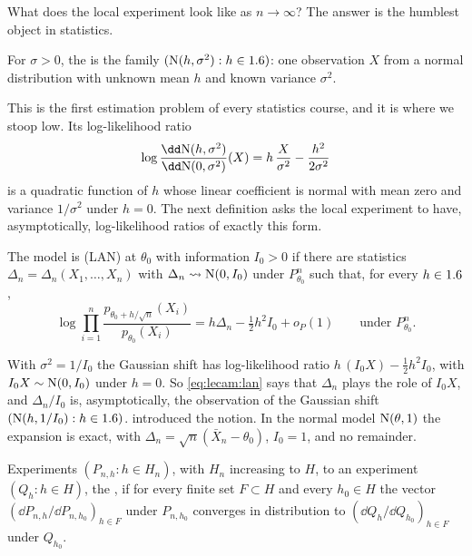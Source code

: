 \begin{refsection}
What does the local experiment look like as $n\to\infty$? The answer is the humblest object in statistics.

\begin{definition}\label{def:lecam:gaussian-shift}
For $\sigma>0$, the  is the family $(\mathrm{N}(h,\sigma^2):h\in1.6)$: one observation $X$ from a normal distribution with unknown mean $h$ and known variance $\sigma^2$.
\end{definition}

This is the first estimation problem of every statistics course, and it is where we stoop low. Its log-likelihood ratio
\[
  \log\frac{\dd\lecamN(h,\sigma^2)}{\dd\lecamN(0,\sigma^2)}(X)=h\,\frac X{\sigma^2}-\frac{h^2}{2\sigma^2}
\]
is a quadratic function of $h$ whose linear coefficient is normal with mean zero and variance $1/\sigma^2$ under $h=0$. The next definition asks the local experiment to have, asymptotically, log-likelihood ratios of exactly this form.

\begin{definition}\label{def:lecam:lan}
The model is  (LAN) at $\theta_0$ with information $I_0>0$ if there are statistics $\Delta_n=\Delta_n(X_1,\dots,X_n)$ with $\Delta_n\rightsquigarrow\mathrm{N}(0,I_0)$ under $P^n_{\theta_0}$ such that, for every $h\in1.6$,
\begin{equation}\label{eq:lecam:lan}
  \log\prod_{i=1}^n\frac{p_{\theta_0+h/\sqrt n}(X_i)}{p_{\theta_0}(X_i)}=h\Delta_n-\tfrac12h^2I_0+o_{P}(1)\qquad\text{under }P^n_{\theta_0}.
\end{equation}
\end{definition}

With $\sigma^2=1/I_0$ the Gaussian shift has log-likelihood ratio $h\,(I_0X)-\frac12h^2I_0$, with $I_0X\sim\mathrm{N}(0,I_0)$ under $h=0$. So \eqref{eq:lecam:lan} says that $\Delta_n$ plays the role of $I_0X$, and $\Delta_n/I_0$ is, asymptotically, the observation of the Gaussian shift $(\mathrm{N}(h,1/I_0):h\in1.6)$. \textcite{LeCam1960} introduced the notion. In the normal model $\mathrm{N}(\theta,1)$ the expansion is exact, with $\Delta_n=\sqrt n(\bar X_n-\theta_0)$, $I_0=1$, and no remainder.

\begin{definition}\label{def:lecam:convergence}
Experiments $(P_{n,h}:h\in H_n)$, with $H_n$ increasing to $H$,  to an experiment $(Q_h:h\in H)$, the , if for every finite set $F\subset H$ and every $h_0\in H$ the vector $(\dd P_{n,h}/\dd P_{n,h_0})_{h\in F}$ under $P_{n,h_0}$ converges in distribution to $(\dd Q_h/\dd Q_{h_0})_{h\in F}$ under $Q_{h_0}$.
\end{definition}


\end{refsection}
